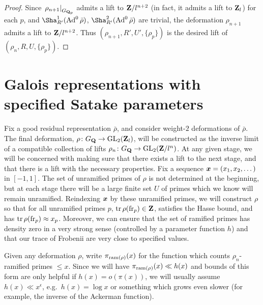 \begin{proof}
Since $\left.\rho_{n+1}\right|_{G_{\mathbf{Q}_p}}$ admits a lift to $\mathbf{Z}/l^{n+2}$ (in 
fact, it admits a lift to $\mathbf{Z}_l$) for each $p$, and 
$\Sha_{R'}^1(\Ad^0\bar\rho)$, $\Sha_{R'}^2(\Ad^0\bar\rho)$ are trivial, the 
deformation $\rho_{n+1}$ admits a lift to $\mathbf{Z}/l^{n+2}$. Thus 
$(\rho_{n+1},R',U',\{\rho_p\})$ is the desired lift of 
$(\rho_n,R,U,\{\rho_p\})$. 
\end{proof}





\section{Galois representations with specified Satake parameters}

Fix a good residual representation $\bar\rho$, and consider weight-$2$ 
deformations of $\bar\rho$. The final deformation, 
$\rho\colon G_{\mathbf{Q}} \to \operatorname{GL}_2(\mathbf{Z}_l)$, will be constructed as the inverse limit 
of a compatible collection of lifts $\rho_n\colon G_{\mathbf{Q}} \to \operatorname{GL}_2(\mathbf{Z}/l^n)$. At 
any given stage, we will be concerned with making sure that there exists a 
lift to the next stage, and that there is a lift with the necessary properties. 
Fix a sequence ${\boldsymbol x}=(x_1,x_2,\dots)$ in $[-1,1]$. The set of unramified primes 
of $\rho$ is not determined at the beginning, but at each stage there will be 
a large finite set $U$ of primes which we know will remain unramified. 
Reindexing ${\boldsymbol x}$ by these unramified primes, we will construct $\rho$ so that 
for all unramified primes $p$, $\operatorname{tr}\rho(\mathrm{fr}_p)\in \mathbf{Z}$, satisfies the Hasse 
bound, and has $\operatorname{tr}\rho(\mathrm{fr}_p) \approx x_p$. Moreover, we can ensure that the 
set of ramified primes has density zero in a very strong sense (controlled by a 
parameter function $h$) and that our trace of Frobenii are very close to 
specified values. 

Given any deformation $\rho$, write $\pi_{\mathrm{ram}(\rho)}(x)$ for the function 
which counts $\rho_n$-ramified primes $\leqslant x$. Since we will have 
$\pi_{\mathrm{ram}(\rho)}(x)\ll h(x)$ and bounds of this form are only helpful 
if $h(x) = o(\pi(x))$, we will usually assume $h(x) \ll x^\epsilon$, 
e.g.~$h(x) = \log x$ or something which grows even slower (for example, the 
inverse of the Ackerman function). 


